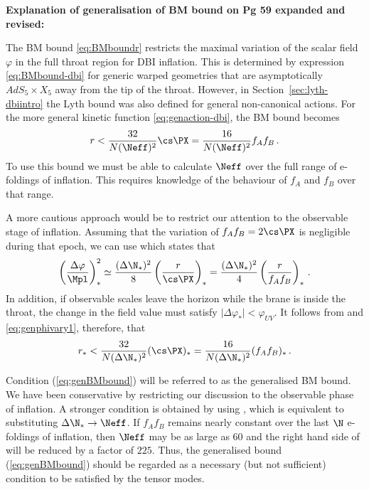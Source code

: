 \textbf{Explanation of generalisation of BM bound on Pg 59 expanded and revised:}

The BM bound \eqref{eq:BMboundr} restricts the maximal 
variation of the scalar field $\varphi$ in the full throat region for DBI inflation. 
This is determined by expression \eqref{eq:BMbound-dbi} 
for generic warped geometries that are asymptotically 
$AdS_5 \times X_5$ away from the tip of the throat. However, in Section~\ref{sec:lyth-dbiintro} the
Lyth bound was also defined for general
non-canonical actions. For the more general kinetic function
\eqref{eq:genaction-dbi}, the BM bound becomes
% 
\begin{equation}
\label{eq:bmboundgen-corr}
 r < \frac{32}{N(\Neff)^2}\cs\PX = \frac{16}{N(\Neff)^2}f_A f_B \,.
\end{equation}
% 
To use this bound we must be able to calculate $\Neff$ over the full range of e-foldings of
inflation. This requires knowledge of the behaviour of $f_A$ and $f_B$ over that range. 

A more cautious approach would be to restrict our attention to 
the observable stage of inflation.
Assuming that the variation
of $f_Af_B = 2 \cs\PX$ is negligible during that epoch, we can use
 which states that 
% 
\begin{equation}
\label{eq:genphivary1-corr}
\left( \frac{\Delta \varphi}{\Mpl} \right)^2_{*} \simeq 
\frac{(\Delta \N_{*} )^2}{8} \left(\frac{r}{\cs\PX}\right)_*  
= \frac{(\Delta \N_{*} )^2}{4} \left(\frac{r}{f_A f_B}\right)_*  \,.
\end{equation}
% 
In addition, 
if observable scales leave the horizon 
while the brane is inside the throat, the change in the field value 
must satisfy $| \Delta \varphi_*|<\varphi_{UV}$. It follows from  and
\eqref{eq:genphivary1}, therefore, that 
% 
\begin{equation}
\label{eq:genBMbound-corr}
r_*< \frac{32}{N (\Delta \N_{*})^2} (\cs\PX)_* = \frac{16}{N (\Delta \N_{*})^2}
(f_Af_B)_* \,.
\end{equation}
% 

Condition 
(\ref{eq:genBMbound}) will be referred to as the 
generalised BM bound. 
We have been
conservative by restricting our discussion to the 
observable phase of inflation. A stronger condition is obtained by using
, which is equivalent to substituting $\Delta \N_* \rightarrow 
\Neff$. If 
$f_Af_B$ remains nearly constant over the last $\N$ 
e-foldings of inflation, 
then $\Neff$ may be as large as $60$ and the right hand side of  will be reduced
by a factor of $225$. 
Thus, the generalised bound 
(\ref{eq:genBMbound}) should be regarded as a necessary 
(but not sufficient) condition to be satisfied by the tensor modes.


